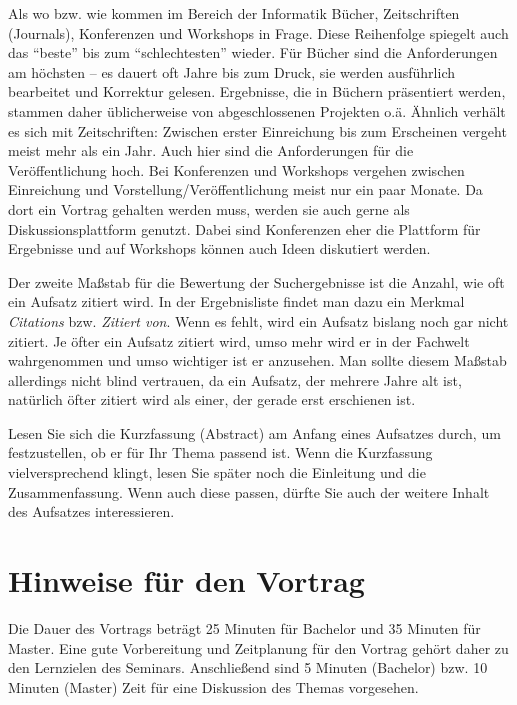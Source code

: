\documentclass[final,bibliography=totocnumbered]{include/sikseminar}
\begin{document}
Als wo bzw. wie kommen im Bereich der Informatik Bücher, Zeitschriften (Journals), Konferenzen und Workshops in Frage. Diese Reihenfolge spiegelt auch das "`beste"' bis zum "`schlechtesten"' wieder. Für Bücher sind die Anforderungen am höchsten -- es dauert oft Jahre bis zum Druck, sie werden ausführlich bearbeitet und Korrektur gelesen. Ergebnisse, die in Büchern präsentiert werden, stammen daher üblicherweise von abgeschlossenen Projekten o.ä. Ähnlich verhält es sich mit Zeitschriften: Zwischen erster Einreichung bis zum Erscheinen vergeht meist mehr als ein Jahr. Auch hier sind die Anforderungen für die Veröffentlichung hoch. Bei Konferenzen und Workshops vergehen zwischen Einreichung und Vorstellung/Veröffentlichung meist nur ein paar Monate. Da dort ein Vortrag gehalten werden muss, werden sie auch gerne als Diskussionsplattform genutzt. Dabei sind Konferenzen eher die Plattform für Ergebnisse und auf Workshops können auch Ideen diskutiert werden.

Der zweite Maßstab für die Bewertung der Suchergebnisse ist die Anzahl, wie oft ein Aufsatz zitiert wird. In der Ergebnisliste findet man dazu ein Merkmal \textit{Citations} bzw. \textit{Zitiert von}. Wenn es fehlt, wird ein Aufsatz bislang noch gar nicht zitiert. Je öfter ein Aufsatz zitiert wird, umso mehr wird er in der Fachwelt wahrgenommen und umso wichtiger ist er anzusehen. Man sollte diesem Maßstab allerdings nicht blind vertrauen, da ein Aufsatz, der mehrere Jahre alt ist, natürlich öfter zitiert wird als einer, der gerade erst erschienen ist.

Lesen Sie sich die Kurzfassung (Abstract) am Anfang eines Aufsatzes durch, um festzustellen, ob er für Ihr Thema passend ist. Wenn die Kurzfassung vielversprechend klingt, lesen Sie später noch die Einleitung und die Zusammenfassung. Wenn auch diese passen, dürfte Sie auch der weitere Inhalt des Aufsatzes interessieren.





\section{Hinweise für den Vortrag}

Die Dauer des Vortrags beträgt 25 Minuten für Bachelor und 35 Minuten für Master. Eine gute Vorbereitung und Zeitplanung für den Vortrag gehört daher zu den Lernzielen des Seminars. Anschließend sind 5 Minuten (Bachelor) bzw. 10 Minuten (Master) Zeit für eine Diskussion des Themas vorgesehen.
\end{document}
